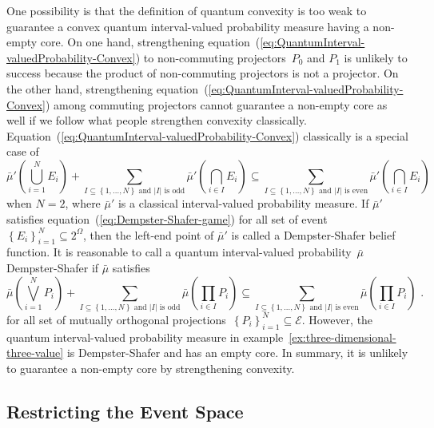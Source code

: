 \documentclass[12pt]{iopart}
\theoremstyle{remark}
\newcommand{\events}{\ensuremath{\mathcal{E}}}
\begin{document}
One possibility is that the definition of quantum convexity is too
weak to guarantee a convex quantum interval-valued probability measure
having a non-empty core. On one hand, strengthening equation~(\ref{eq:QuantumInterval-valuedProbability-Convex})
to non-commuting projectors~$P_{0}$ and $P_{1}$ is unlikely to
success because the product of non-commuting projectors is not a projector.
On the other hand, strengthening equation~(\ref{eq:QuantumInterval-valuedProbability-Convex})
among commuting projectors cannot guarantee a non-empty core as well
if we follow what people strengthen convexity classically. Equation~(\ref{eq:QuantumInterval-valuedProbability-Convex})
classically is a special case of 
\begin{equation}
\bar{\mu}'\left(\bigcup_{i=1}^{N}E_{i}\right)+\sum_{I\subseteq\left\{ 1,\ldots,N\right\} \textrm{ and }\left|I\right|\textrm{ is odd}}\bar{\mu}'\left(\bigcap_{i\in I}E_{i}\right)\subseteq\sum_{I\subseteq\left\{ 1,\ldots,N\right\} \textrm{ and }\left|I\right|\textrm{ is even}}\bar{\mu}'\left(\bigcap_{i\in I}E_{i}\right)\label{eq:Dempster-Shafer-game}
\end{equation}
when $N=2$, where $\bar{\mu}'$ is a classical interval-valued probability
measure. If $\bar{\mu}'$ satisfies equation~(\ref{eq:Dempster-Shafer-game})
for all set of event~$\left\{ E_{i}\right\} _{i=1}^{N}\subseteq2^{\Omega}$,
then the left-end point of $\bar{\mu}'$ is called a Dempster-Shafer
belief function. It is reasonable to call a quantum interval-valued
probability~$\bar{\mu}$ Dempster-Shafer if $\bar{\mu}$ satisfies
\begin{equation}
\bar{\mu}\left(\bigvee_{i=1}^{N}P_{i}\right)+\sum_{I\subseteq\left\{ 1,\ldots,N\right\} \textrm{ and }\left|I\right|\textrm{ is odd}}\bar{\mu}\left(\prod_{i\in I}P_{i}\right)\subseteq\sum_{I\subseteq\left\{ 1,\ldots,N\right\} \textrm{ and }\left|I\right|\textrm{ is even}}\bar{\mu}\left(\prod_{i\in I}P_{i}\right)\textrm{ .}\label{eq:Dempster-Shafer-game-quantum}
\end{equation}
for all set of mutually orthogonal projections~$\left\{ P_{i}\right\} _{i=1}^{N}\subseteq\events$.
However, the quantum interval-valued probability measure in example~\ref{ex:three-dimensional-three-value}
is Dempster-Shafer and has an empty core. In summary, it is unlikely
to guarantee a non-empty core by strengthening convexity.

\subsection{Restricting the Event Space}
\end{document}
